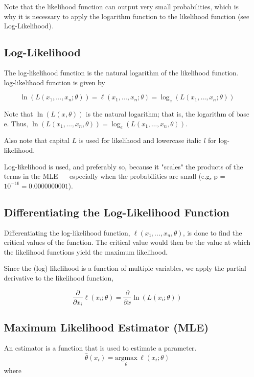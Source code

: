 \documentclass{article}
\begin{document}
Note that the likelihood function can output very small probabilities, which is why it is necessary to apply the logarithm function to the likelihood function (see Log-Likelihood).

\subsection{Log-Likelihood}
The log-likelihood function is the natural logarithm of the likelihood function. log-likelihood function is given by

$$
\ln(L(x_1, \dots, x_n; \theta)) = \ell(x_1, \dots, x_n; \theta) = \log_{e} ( L(x_1, \dots, x_n; \theta) )
$$ 

Note that $ \ln(L(x, \theta)) $ is the natural logarithm; that is, the logarithm of base e. Thus, $ \ln(L(x_1, \dots, x_n, \theta)) = \log_{e} ( L(x_1, \dots, x_n, \theta) ) $.

Also note that capital $L$ is used for likelihood and lowercase italic $l$ for log-likelihood.

Log-likelihood is used, and preferably so, because it "scales" the products of the terms in the MLE — especially when the probabilities are small (e.g, p = $10^{-10} = 0.0000000001 $).

\subsection{Differentiating the Log-Likelihood Function}
Differentiating the log-likelihood function, $\ell(x_1, \dots, x_n,\theta)$, is done to find the critical values of the function. The critical value would then be the value at which the likelihood functions yield the maximum likelihood.

Since the (log) likelihood is a function of multiple variables, we apply the partial derivative to the likelihood function,

$$
\frac{\partial}{\partial x_i} \ell(x_i; \theta) = \frac{\partial}{\partial x} \ln( L(x_i; \theta) )
$$

\subsection{Maximum Likelihood Estimator (MLE)}
An estimator is a function that is used to estimate a parameter.
$$
\hat{\theta}(x_i) = \underset{\theta}{\text{argmax}} \: \ell(x_i; \theta)
$$
where 
\end{document}

